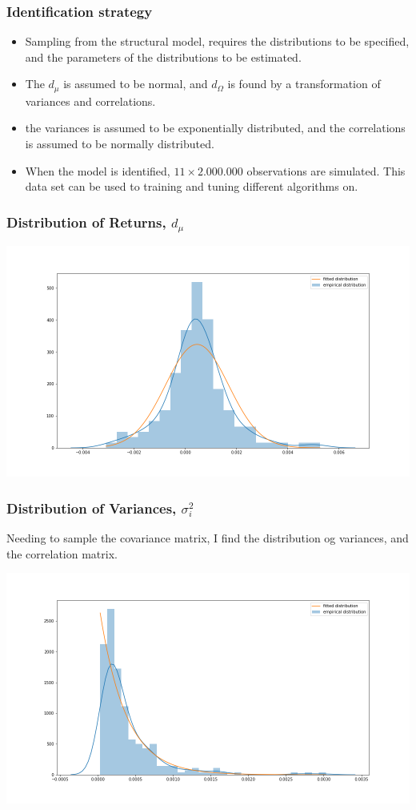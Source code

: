 \documentclass{beamer}
\begin{document}
\begin{frame}
\frametitle{Identification strategy}
\begin{itemize}
    \item Sampling from the structural model, requires the distributions to be specified, and the parameters of the distributions to be estimated.
    \item The $d_{\mu}$ is assumed to be normal, and $d_{\Omega}$ is found by a transformation of variances and correlations.
    \item the variances is assumed to be exponentially distributed, and the correlations is assumed to be normally distributed.
    \item When the model is identified, $11 \times 2.000.000$ observations are simulated. This data set can be used to training and tuning different algorithms on.
\end{itemize}

\end{frame}

\begin{frame}
\frametitle{Distribution of Returns, $d_{\mu}$}

\centering
\includegraphics[scale=0.32]{../figures/distribution_means.png}

\end{frame}

\begin{frame}
\frametitle{Distribution of Variances, $\sigma_i^{2}$}

Needing to sample the covariance matrix, I find the distribution og variances, and the correlation matrix.

\centering
\includegraphics[scale=0.32]{../figures/distribution_variances.png}

\end{frame}
\end{document}

